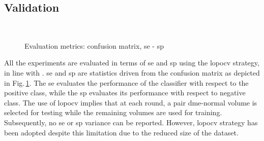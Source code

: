 \subsection{Validation}\label{sec:exp:validation}


\begin{figure}

  \def\myRadius{.65cm}
  \def\vennSpace{(0,0) rectangle (2.6cm,1.6cm)}
  \def\predictedCircle{(.8cm,.8cm) circle (\myRadius)}
  \def\actualCircle{(1.8cm,.8cm) circle (\myRadius)}
  \def\myLabelRadius{.450cm}

  \\
  \centering

  \caption{Evaluation metrics:
    \protect{} confusion matrix,
    \protect{} \ac{se} - \ac{sp}
  }
  \label{fig:CM}
\end{figure}

All the experiments are evaluated in terms of \acf{se} and \acf{sp} using the \ac{lopocv} strategy, in line with \cite{Lemaintre2015miccaiOCT}.
\ac{se} and \ac{sp} are statistics driven from the confusion matrix as depicted in Fig.\,\ref{fig:CM}.
The \ac{se} evaluates the performance of the classifier with respect to the positive class, while the \ac{sp} evaluates its performance with respect to negative class.
The use of \ac{lopocv} implies that at each round, a pair \ac{dme}-normal volume is selected for testing while the remaining volumes are used for training.
Subsequently, no \ac{se} or \ac{sp} variance can be reported.
However, \ac{lopocv} strategy has been adopted despite this limitation due to the reduced size of the dataset.





